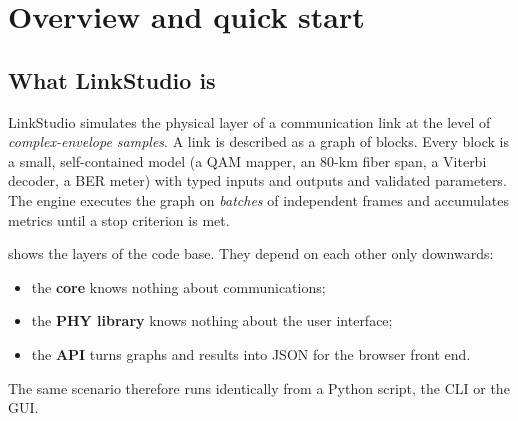 \chapter{Overview and quick start}\label{ch:overview}

\section{What LinkStudio is}
LinkStudio simulates the physical layer of a communication link at the level of
\emph{complex-envelope samples}. A link is described as a graph of blocks. Every block is a
small, self-contained model (a QAM mapper, an 80-km fiber span, a Viterbi decoder, a BER
meter) with typed inputs and outputs and validated parameters. The engine executes the
graph on \emph{batches} of independent frames and accumulates metrics until a stop criterion
is met.

 shows the layers of the code base. They depend on each other only
downwards:
\begin{itemize}
  \item the \textbf{core} knows nothing about communications;
  \item the \textbf{PHY library} knows nothing about the user interface;
  \item the \textbf{API} turns graphs and results into JSON for the browser front end.
\end{itemize}
The same scenario therefore runs identically from a Python script, the CLI or the GUI.


